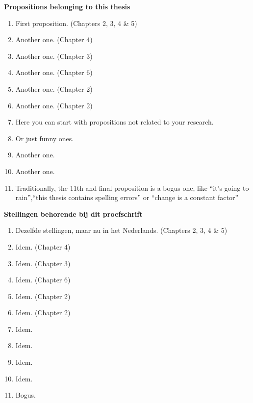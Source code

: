 \documentclass[12pt]{report}
\begin{document}
\pagestyle{empty}


\begin{center}
{\Large \bf Propositions belonging to this thesis}
\vspace{10mm}
\end{center}

\begin{enumerate}
\item First proposition. (Chapters 2, 3, 4 \& 5)
\item Another one. (Chapter 4)
\item Another one. (Chapter 3)
\item Another one. (Chapter 6)
\item Another one. (Chapter 2)
\item Another one. (Chapter 2)

\item Here you can start with propositions not related to your research.
\item Or just funny ones.
\item Another one.
\item Another one.
\item Traditionally, the 11th and final proposition is a bogus one, like ``it's going to rain'',``this thesis contains spelling errors'' or ``change is a constant factor''
\end{enumerate}

\clearpage
{}

\begin{center}
{\Large \bf Stellingen behorende bij dit proefschrift}
\vspace{10mm}
\end{center}
\begin{enumerate}
\item Dezelfde stellingen, maar nu in het Nederlands. (Chapters 2, 3, 4 \& 5)
\item Idem. (Chapter 4)
\item Idem. (Chapter 3)
\item Idem. (Chapter 6)
\item Idem. (Chapter 2)
\item Idem. (Chapter 2)
\item Idem.
\item Idem.
\item Idem.
\item Idem.
\item Bogus.
\end{enumerate}
\end{document}
